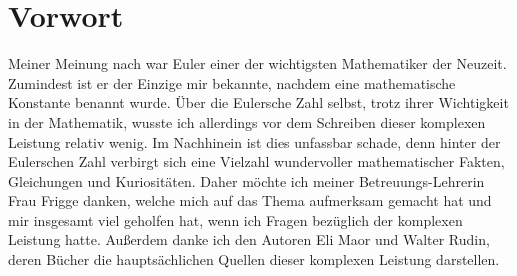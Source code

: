 \section{Vorwort}
Meiner Meinung nach war Euler einer der wichtigsten Mathematiker der Neuzeit. Zumindest ist er der Einzige mir bekannte, nachdem eine mathematische Konstante benannt wurde. Über die Eulersche Zahl selbst, trotz ihrer Wichtigkeit in der Mathematik, wusste ich allerdings vor dem Schreiben dieser komplexen Leistung relativ wenig. Im Nachhinein ist dies unfassbar schade, denn hinter der Eulerschen Zahl verbirgt sich eine Vielzahl wundervoller mathematischer Fakten, Gleichungen und Kuriositäten. Daher möchte ich meiner Betreuungs-Lehrerin Frau Frigge danken, welche mich auf das Thema aufmerksam gemacht hat und mir insgesamt viel geholfen hat, wenn ich Fragen bezüglich der komplexen Leistung hatte. Außerdem danke ich den Autoren Eli Maor und Walter Rudin, deren Bücher die hauptsächlichen Quellen dieser komplexen Leistung darstellen.
